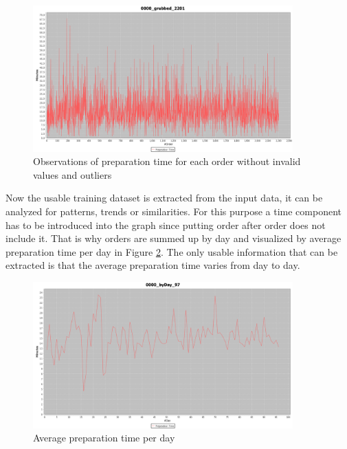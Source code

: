 \begin{figure}[h]
\begin{center}
\includegraphics[width=10cm]{images/0000_grubbed_2201.png}
\caption{Observations of preparation time for each order without invalid values and outliers}
\label{fig:0000_grubbed_2201}
\end{center}
\end{figure}



Now the usable training dataset is extracted from the input data, it can be analyzed for patterns, trends or similarities. For this purpose a time component has to be introduced into the graph since putting order after order does not include it. That is why orders are summed up by day and visualized by average preparation time per day in Figure \ref{fig:0000_byDay_97}. The only usable information that can be extracted is that the average preparation time varies from day to day.

\begin{figure}[h]
\begin{center}
\includegraphics[width=10cm]{images/0000_byDay_97.png}
\caption{Average preparation time per day}
\label{fig:0000_byDay_97}
\end{center}
\end{figure}

